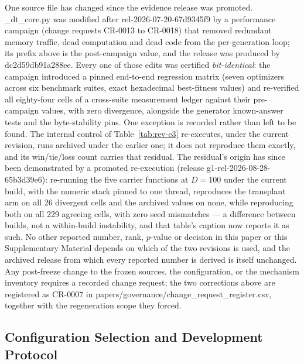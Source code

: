 \documentclass[algorithms,article,submit,moreauthors,pdftex]{Definitions/mdpi}
\begin{document}
\noindent One source file has changed since the evidence release was promoted.
\_dt\_core.py was modified after \mbox{rel-2026-07-20-67d9345f9} by a
performance campaign (change requests CR-0013 to CR-0018) that removed redundant
memory traffic, dead computation and dead code from the per-generation loop; its
prefix above is the post-campaign value, and the release was produced by
dc2d59db91a288ee. Every one of those edits was certified
\emph{bit-identical}: the campaign introduced a pinned end-to-end regression
matrix (seven optimizers across six benchmark suites, exact hexadecimal
\mbox{best-fitness} values) and re-verified all eighty-four cells of a
cross-suite measurement ledger against their pre-campaign values, with zero
divergence, alongside the generator known-answer tests and the byte-stability
pins. One exception is recorded rather than left to be found. The internal
control of Table~\ref{tab:rev-e3} re-executes, under the current revision,
runs archived under the earlier one; it does not reproduce them exactly, and
its win/tie/loss count carries that residual. The residual's origin has since
been demonstrated by a promoted re-execution (release g1-rel-2026-08-28-65b3d39e6):
re-running the five carrier functions at $D = 100$ under the current build,
with the numeric stack pinned to one thread, reproduces the transplant arm on
all 26 divergent cells and the archived values on none, while reproducing
both on all 229 agreeing cells, with zero seed mismatches --- a difference
between builds, not a within-build instability, and that table's caption now
reports it as such. No other reported number, rank, $p$-value or decision
in this paper or this Supplementary Material depends on which of the two
revisions is used, and the archived release from which every reported number
is derived is itself unchanged.
Any post-freeze change to the frozen sources, the configuration, or the
mechanism inventory requires a recorded change request; the two corrections
above are registered as CR-0007 in
papers/governance/change\_request\_register.csv, together with the
regeneration scope they forced.

\subsection{Configuration Selection and Development Protocol}\label{sec:repro:tuning}
\end{document}
